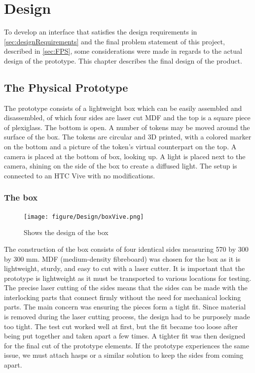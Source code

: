 \chapter{Design}
To develop an interface that satisfies the design requirements in \autoref{sec:designRequirements} and the final problem statement of this project, described in \autoref{sec:FPS}, some considerations were made in regards to the actual design of the prototype. This chapter describes the final design of the product.

\section{The Physical Prototype}

The prototype consists of a lightweight box which can be easily assembled and disassembled, of which four sides are laser cut MDF and the top is a square piece of plexiglass. The bottom is open. A number of tokens may be moved around the surface of the box. The tokens are circular and 3D printed, with a colored marker on the bottom and a picture of the token's virtual counterpart on the top. A camera is placed at the bottom of box, looking up. A light is placed next to the camera, shining on the side of the box to create a diffused light. 
The setup is connected to an HTC Vive with no modifications.

\subsection{The box}
\begin{figure}[H]
	\centering
	\texttt{[image: figure/Design/boxVive.png]}
	\caption{Shows the design of the box}
	\label{fig:boxVive}
\end{figure}

The construction of the box consists of four identical sides measuring 570 by 300 by 300 mm. MDF (medium-density fibreboard) was chosen for the box as it is lightweight, sturdy, and easy to cut with a laser cutter. It is important that the prototype is lightweight as it must be transported to various locations for testing. The precise laser cutting of the sides means that the sides can be made with the interlocking parts that connect firmly without the need for mechanical locking parts. The main concern was ensuring the pieces form a tight fit. Since material is removed during the laser cutting process, the design had to be purposely made too tight. The test cut worked well at first, but the fit became too loose after being put together and taken apart a few times. A tighter fit was then designed for the final cut of the prototype elements. If the prototype experiences the same issue, we must attach hasps or a similar solution to keep the sides from coming apart. 

